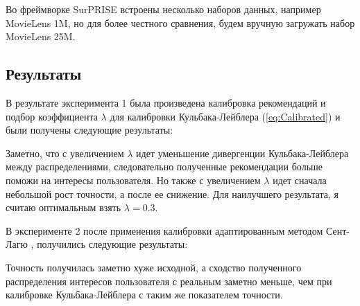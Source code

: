 Во фреймворке SurPRISE \cite{sur} встроены несколько наборов данных, например MovieLens 1M, но для 
более честного сравнения, будем вручную загружать набор MovieLens 25M.
\subsection{Результаты}

В результате эксперимента 1 была произведена калибровка рекомендаций и подбор коэффициента $\lambda$ для калибровки Кульбака-Лейблера (\ref{eq:Calibrated})
и были получены следующие результаты:
\begin{center}
   \end{center}
Заметно, что с увеличением $\lambda$ идет уменьшение дивергенции Кульбака-Лейблера между распределениями, следовательно
полученные рекомендации больше поможи на интересы пользователя. Но также 
с увеличением $\lambda$ идет сначала небольшой рост точности, а после ее снижение.
Для наилучшего результата, я считаю оптимальным взять $\lambda=0.3$.

В эксперименте 2 после применения калибровки адаптированным методом Сент-Лагю \cite{bib5}, получились следующие результаты:
\begin{center}
   \end{center}
Точность получилась заметно хуже исходной, а сходство полученного
распределения интересов пользователя с реальным заметно меньше, чем 
при калибровке Кульбака-Лейблера с таким же показателем точности.

